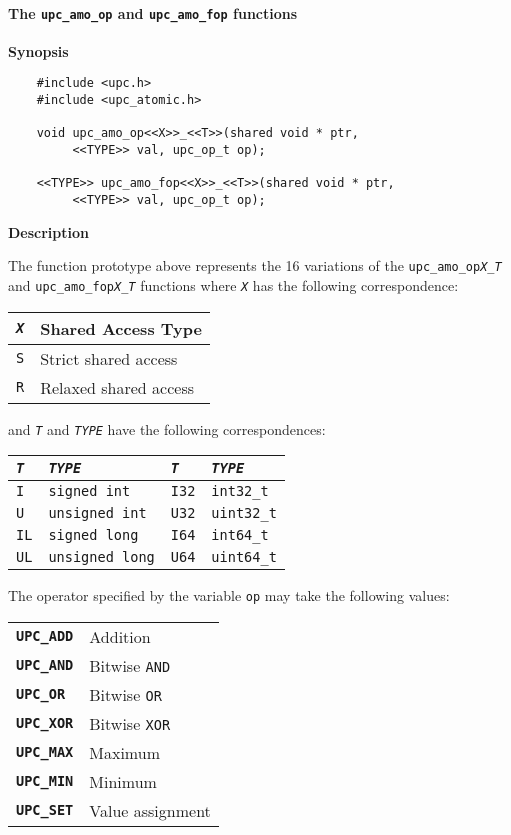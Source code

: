 \paragraph{The {\tt upc\_amo\_op} and {\tt upc\_amo\_fop} functions}

{\bf Synopsis} 

\npf\vspace{-2.5em}
\begin{verbatim}
    #include <upc.h>
    #include <upc_atomic.h>

    void upc_amo_op<<X>>_<<T>>(shared void * ptr,
         <<TYPE>> val, upc_op_t op);

    <<TYPE>> upc_amo_fop<<X>>_<<T>>(shared void * ptr,
         <<TYPE>> val, upc_op_t op);
\end{verbatim}

{\bf Description}

\np The function prototype above represents the 16 variations of the
    {\tt upc\_amo\_op{\em X}\_{\em T}} and {\tt upc\_amo\_fop{\em X}\_{\em T}}
    functions where {\tt{\em X}} has the following correspondence:
\begin{center}
\begin{tabular}{ll}
{\tt{\em X}} & {Shared Access Type} \\ \hline
{\tt S} & {Strict shared access} \\
{\tt R} & {Relaxed shared access} \\
\end{tabular}
\end{center}
    and {\tt{\em T}} and {\tt{\em TYPE}} have the following correspondences:
\begin{center}
\begin{tabular}{ll|ll}
{\tt{\em T}} & {\tt{\em TYPE}} \hspace*{1.5in} &
{\tt{\em T}} & {\tt{\em TYPE}} \\ \hline
{\tt I} & {\tt signed int} &
{\tt I32} & {\tt int32\_t} \\
{\tt U} & {\tt unsigned int} &
{\tt U32} & {\tt uint32\_t} \\
{\tt IL} & {\tt signed long} &
{\tt I64} & {\tt int64\_t} \\
{\tt UL} & {\tt unsigned long} &
{\tt U64} & {\tt uint64\_t} \\
\end{tabular}
\end{center}
    
\np The operator specified by the variable {\tt op} may take the following
    values:
\begin{tabular}{ll}
{\textbf{\tt UPC\_ADD}} & Addition \\
{\textbf{\tt UPC\_AND}} & Bitwise {\tt AND} \\
{\textbf{\tt UPC\_OR}}  & Bitwise {\tt OR} \\
{\textbf{\tt UPC\_XOR}} & Bitwise {\tt XOR} \\
{\textbf{\tt UPC\_MAX}} & Maximum \\
{\textbf{\tt UPC\_MIN}} & Minimum \\
{\textbf{\tt UPC\_SET}} & Value assignment \\
\end{tabular}


